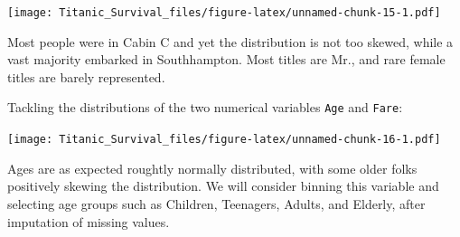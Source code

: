 \documentclass[]{article}
\newenvironment{Shaded}{\begin{snugshade}}{\end{snugshade}}
\newcommand{\KeywordTok}[1]{\textcolor[rgb]{0.13,0.29,0.53}{\textbf{#1}}}
\newcommand{\DataTypeTok}[1]{\textcolor[rgb]{0.13,0.29,0.53}{#1}}
\newcommand{\DecValTok}[1]{\textcolor[rgb]{0.00,0.00,0.81}{#1}}
\newcommand{\FloatTok}[1]{\textcolor[rgb]{0.00,0.00,0.81}{#1}}
\newcommand{\StringTok}[1]{\textcolor[rgb]{0.31,0.60,0.02}{#1}}
\newcommand{\OtherTok}[1]{\textcolor[rgb]{0.56,0.35,0.01}{#1}}
\newcommand{\OperatorTok}[1]{\textcolor[rgb]{0.81,0.36,0.00}{\textbf{#1}}}
\newcommand{\NormalTok}[1]{#1}
\begin{document}
\texttt{[image: Titanic\_Survival\_files/figure-latex/unnamed-chunk-15-1.pdf]}

Most people were in Cabin C and yet the distribution is not too skewed,
while a vast majority embarked in Southhampton. Most titles are Mr., and
rare female titles are barely represented.

Tackling the distributions of the two numerical variables \texttt{Age}
and \texttt{Fare}:

\begin{Shaded}
\end{Shaded}

\texttt{[image: Titanic\_Survival\_files/figure-latex/unnamed-chunk-16-1.pdf]}

Ages are as expected roughtly normally distributed, with some older
folks positively skewing the distribution. We will consider binning this
variable and selecting age groups such as Children, Teenagers, Adults,
and Elderly, after imputation of missing values.
\end{document}
